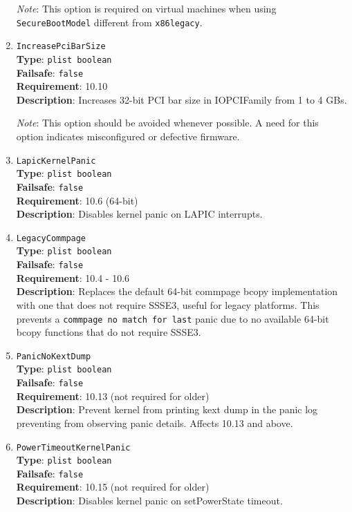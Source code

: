 \documentclass[]{article}
\begin{document}
\begin{enumerate}
  \emph{Note}: This option is required on virtual machines when using
  \texttt{SecureBootModel} different from \texttt{x86legacy}.

\item
  \texttt{IncreasePciBarSize}\\
  \textbf{Type}: \texttt{plist\ boolean}\\
  \textbf{Failsafe}: \texttt{false}\\
  \textbf{Requirement}: 10.10\\
  \textbf{Description}: Increases 32-bit PCI bar size in IOPCIFamily from 1 to 4 GBs.

  \emph{Note}: This option should be avoided whenever possible. A need for this option
  indicates misconfigured or defective firmware.

\item
  \texttt{LapicKernelPanic}\\
  \textbf{Type}: \texttt{plist\ boolean}\\
  \textbf{Failsafe}: \texttt{false}\\
  \textbf{Requirement}: 10.6 (64-bit)\\
  \textbf{Description}: Disables kernel panic on LAPIC interrupts.

\item
  \texttt{LegacyCommpage}\\
  \textbf{Type}: \texttt{plist\ boolean}\\
  \textbf{Failsafe}: \texttt{false}\\
  \textbf{Requirement}: 10.4 - 10.6\\
  \textbf{Description}: Replaces the default 64-bit commpage bcopy implementation with
  one that does not require SSSE3, useful for legacy platforms. This prevents a
  \texttt{commpage no match for last} panic due to no available 64-bit bcopy functions
  that do not require SSSE3.

\item
  \texttt{PanicNoKextDump}\\
  \textbf{Type}: \texttt{plist\ boolean}\\
  \textbf{Failsafe}: \texttt{false}\\
  \textbf{Requirement}: 10.13 (not required for older)\\
  \textbf{Description}: Prevent kernel from printing kext dump in the panic
  log preventing from observing panic details. Affects 10.13 and above.

\item
  \texttt{PowerTimeoutKernelPanic}\\
  \textbf{Type}: \texttt{plist\ boolean}\\
  \textbf{Failsafe}: \texttt{false}\\
  \textbf{Requirement}: 10.15 (not required for older)\\
  \textbf{Description}: Disables kernel panic on setPowerState timeout.


\end{enumerate}
\end{document}
